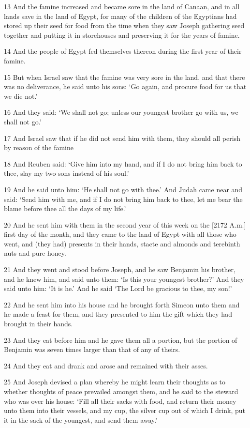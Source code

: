 \par 13 And the famine increased and became sore in the land of Canaan, and in all lands save in the land of Egypt, for many of the children of the Egyptians had stored up their seed for food from the time when they saw Joseph gathering seed together and putting it in storehouses and preserving it for the years of famine.
\par 14 And the people of Egypt fed themselves thereon during the first year of their famine.
\par 15 But when Israel saw that the famine was very sore in the land, and that there was no deliverance, he said unto his sons: ‘Go again, and procure food for us that we die not.’
\par 16 And they said: ‘We shall not go; unless our youngest brother go with us, we shall not go.’
\par 17 And Israel saw that if he did not send him with them, they should all perish by reason of the famine
\par 18 And Reuben said: ‘Give him into my hand, and if I do not bring him back to thee, slay my two sons instead of his soul.’
\par 19 And he said unto him: ‘He shall not go with thee.’ And Judah came near and said: ‘Send him with me, and if I do not bring him back to thee, let me bear the blame before thee all the days of my life.’
\par 20 And he sent him with them in the second year of this week on the [2172 A.m.] first day of the month, and they came to the land of Egypt with all those who went, and (they had) presents in their hands, stacte and almonds and terebinth nuts and pure honey.
\par 21 And they went and stood before Joseph, and he saw Benjamin his brother, and he knew him, and said unto them: ‘Is this your youngest brother?’ And they said unto him: ‘It is he.’ And he said ‘The Lord be gracious to thee, my son!’
\par 22 And he sent him into his house and he brought forth Simeon unto them and he made a feast for them, and they presented to him the gift which they had brought in their hands.
\par 23 And they eat before him and he gave them all a portion, but the portion of Benjamin was seven times larger than that of any of theirs.
\par 24 And they eat and drank and arose and remained with their asses.
\par 25 And Joseph devised a plan whereby he might learn their thoughts as to whether thoughts of peace prevailed amongst them, and he said to the steward who was over his house: ‘Fill all their sacks with food, and return their money unto them into their vessels, and my cup, the silver cup out of which I drink, put it in the sack of the youngest, and send them away.’

